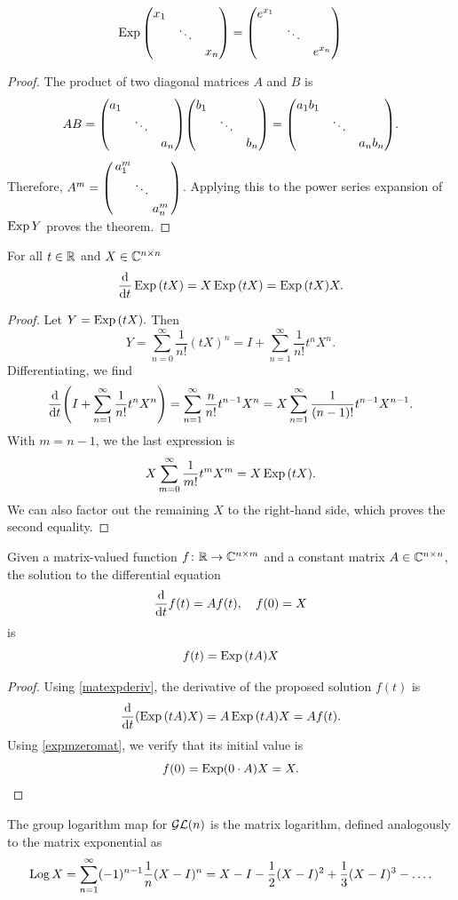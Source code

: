 \documentclass[../../main.tex]{subfiles}
\begin{document}
\begin{refsection}
	\begin{theorem}
		$$\expm \mqty(\dmat{x_1, \ddots, x_n}) = \mqty(\dmat{e^{x_1}, \ddots, e^{x_n}})$$
	\end{theorem}
	\begin{proof}
		The product of two diagonal matrices $A$ and $B$ is
		$$A B = \mqty(\dmat{a_1, \ddots, a_n}) \mqty(\dmat{b_1, \ddots, b_n}) = \mqty(\dmat{a_1 b_1, \ddots, a_n b_n}).$$
		Therefore, $A^m = \smqty(\dmat{a_1^m, \ddots, a_n^m})$.
		Applying this to the power series expansion of $\operatorname{Exp} Y$ proves the theorem.
	\end{proof}

	\begin{theorem} \label{matexpderiv}
		For all $t \in \mathbb{R}$ and $X \in \mathbb{C}^{n \times n}$
		$$\dv{t} \operatorname{Exp} \qty(t X) = X \operatorname{Exp} \qty(t X) = \operatorname{Exp} \qty(t X) X.$$
	\end{theorem}
	\begin{proof}
		Let $Y = \operatorname{Exp} \qty(t X).$
		Then
		$$Y = \sum_{n=0}^\infty \frac{1}{n!} (t X)^n = I + \sum_{n=1}^\infty \frac{1}{n!} t^n X^n.$$
		Differentiating, we find
		$$
			\dv{t} \qty(I + \sum_{n=1}^\infty \frac{1}{n!} t^n X^n ) =
			\sum_{n=1}^\infty \frac{n}{n!} t^{n-1} X^n =
			X \sum_{n=1}^\infty \frac{1}{(n - 1)!} t^{n-1} X^{n - 1}.
		$$
		With $m = n - 1$, we the last expression is
		$$X \sum_{m=0}^\infty \frac{1}{m!} t^m X^m = X \operatorname{Exp} \qty( t X ).$$
		We can also factor out the remaining $X$ to the right-hand side, which proves the second equality.
	\end{proof}

	\begin{theorem}\label{expm_ode_int}
		Given a matrix-valued function $f \colon \mathbb{R} \to \mathbb{C}^{n \times m}$ and a constant matrix $A \in \mathbb{C}^{n \times n}$, the solution to the differential equation
		$$\dv{t} f(t) = A f(t), \quad f(0) = X$$
		is
		$$f(t) = \operatorname{Exp}\qty(t A) X$$
	\end{theorem}
	\begin{proof}
		Using \cref{matexpderiv}, the derivative of the proposed solution $f(t)$ is
		$$\dv{t}\qty(\operatorname{Exp}\qty(t A) X) = A \operatorname{Exp}\qty(t A) X = A f(t).$$
		Using \cref{expmzeromat}, we verify that its initial value is
		$$f(0) = \operatorname{Exp}(0 \cdot A) X = X.$$
	\end{proof}

	The group logarithm map for $\mathcal{GL} (n)$ is the matrix logarithm, defined analogously to the matrix exponential as
	\begin{equation}\label{matlog}
		\logm \mat{X} = \sum_{n=1}^\infty (-1)^{n-1} \frac{1}{n} (X - I)^n
		= X - I - \frac{1}{2} (X - I)^2 + \frac{1}{3} (X - I)^3 - \ldots.
	\end{equation}


\end{refsection}
\end{document}
